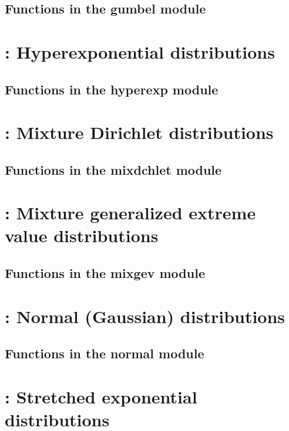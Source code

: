 \documentclass[10pt]{book}
\begin{document}
\subsection{Functions in the gumbel module}


\newpage
\section{: Hyperexponential distributions}

\subsection{Functions in the hyperexp module}


\newpage
\section{: Mixture Dirichlet distributions}
%
\subsection{Functions in the mixdchlet module}
%

\newpage
\section{: Mixture generalized extreme value distributions}
%
\subsection{Functions in the mixgev module}


\newpage
\section{: Normal (Gaussian) distributions}

\subsection{Functions in the normal module}


\newpage
\section{: Stretched exponential distributions}

\end{document}
